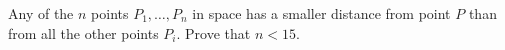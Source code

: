 Any of the $n$ points $P_1, \ldots, P_n$ in space has a smaller distance from point $P$ than from all the other points $P_i$. Prove that $n < 15$.
